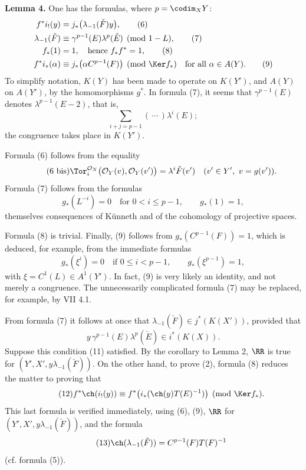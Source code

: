 \textbf{Lemma 4.} One has the formulas, where \(p=\codim_XY\):
\begin{align}
  f^*i_!(y)&=j_*\bigl(\lambda_{-1}(\check F)y\bigr), \tag{6}\\
  \lambda_{-1}(\check F)&\equiv \gamma^{p-1}(E)\lambda^p(\check E)
    \pmod{1-L}, \tag{7}\\
  f_*(1)&=1,\quad\text{hence }f_*f^*=1, \tag{8}\\
  f^*i_*(\alpha)&\equiv j_*\bigl(\alpha C^{p-1}(F)\bigr)
    \pmod{\Ker f_*}\quad\text{for all }\alpha\in A(Y). \tag{9}
\end{align}
To simplify notation, \(K(Y)\) has been made to operate on \(K(Y')\), and \(A(Y)\) on \(A(Y')\), by the homomorphisms \(g^*\). In formula (7), it seems that \(\gamma^{p-1}(E)\) denotes \(\lambda^{p-1}(E-2)\), that is,
\[
  \sum_{i+j=p-1}(\,\cdots\,)\lambda^i(E);
\]
the congruence takes place in \(K(Y')\).

Formula (6) follows from the equality
\begin{equation}\tag{6 bis}
  \Tor_i^{\mathcal O_X}\bigl(\mathcal O_Y(v),\mathcal O_Y(v')\bigr)
  =
  \lambda^i\check F(v')
  \quad (v'\in Y',\ v=g(v')).
\end{equation}
Formula (7) follows from the formulas
\begin{equation}\tag{10}
  g_*(L^{-i})=0\quad\text{for }0<i\leq p-1,\qquad g_*(1)=1,
\end{equation}
themselves consequences of Künneth and of the cohomology of projective spaces.

Formula (8) is trivial. Finally, (9) follows from \(g_*(C^{p-1}(F))=1\), which is deduced, for example, from the immediate formulas
\begin{equation}\tag{10 bis}
  g_*(\xi^i)=0\quad\text{if }0\leq i<p-1,\qquad
  g_*(\xi^{p-1})=1,
\end{equation}
with \(\xi=C^1(L)\in A^1(Y')\). In fact, (9) is very likely an identity, and not merely a congruence. The unnecessarily complicated formula (7) may be replaced, for example, by VII 4.1.

From formula (7) it follows at once that \(\lambda_{-1}(\check F)\in j^*(K(X'))\), provided that
\begin{equation}\tag{11}
  y\,\gamma^{p-1}(E)\lambda^p(\check E)\in i^*(K(X)).
\end{equation}
Suppose this condition (11) satisfied. By the corollary to Lemma 2, \(\RR\) is true for \((Y',X',y\lambda_{-1}(\check F))\). On the other hand, to prove (2), formula (8) reduces the matter to proving that
\begin{equation}\tag{12}
  f^*\ch(i_!(y))
  \equiv
  f^*\bigl(i_*(\ch(y)T(E)^{-1})\bigr)
  \pmod{\Ker f_*}.
\end{equation}
This last formula is verified immediately, using (6), (9), \(\RR\) for \((Y',X',y\lambda_{-1}(\check F))\), and the formula
\begin{equation}\tag{13}
  \ch(\lambda_{-1}(\check F))=C^{p-1}(F)T(F)^{-1}
\end{equation}
(cf. formula (5)).

